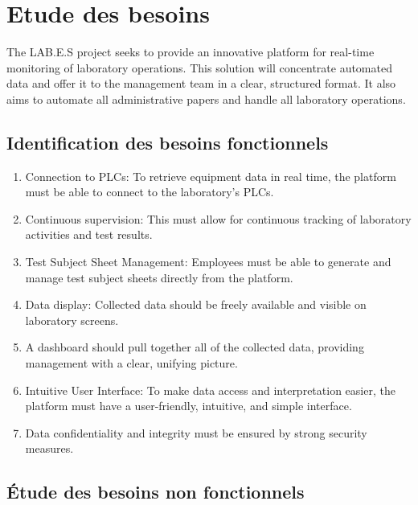 \section{Etude des besoins}

The LAB.E.S project seeks to provide an innovative platform for real-time monitoring of laboratory operations. This solution will concentrate automated data and offer it to the management team in a clear, structured format. It also aims to automate all administrative papers and handle all laboratory operations.

\subsection{Identification des besoins fonctionnels}
\begin{enumerate}
    \item

Connection to PLCs: To retrieve equipment data in real time, the platform must be able to connect to the laboratory's PLCs.
\item
Continuous supervision: This must allow for continuous tracking of laboratory activities and test results.
\item
Test Subject Sheet Management: Employees must be able to generate and manage test subject sheets directly from the platform.
\item
Data display: Collected data should be freely available and visible on laboratory screens.
\item
A dashboard should pull together all of the collected data, providing management with a clear, unifying picture.
\item
Intuitive User Interface: To make data access and interpretation easier, the platform must have a user-friendly, intuitive, and simple interface.
\item
Data confidentiality and integrity must be ensured by strong security measures.
\end{enumerate}
\subsection{Étude des besoins non fonctionnels}


